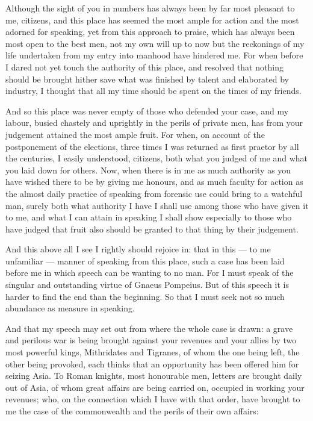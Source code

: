 %

 Although the sight of you in numbers has always been by far most pleasant to me, citizens, and this place has seemed the most ample for action and the most adorned for speaking, yet from this approach to praise, which has always been most open to the best men, not my own will up to now but the reckonings of my life undertaken from my entry into manhood have hindered me. For when before I dared not yet touch the authority of this place, and resolved that nothing should be brought hither save what was finished by talent and elaborated by industry, I thought that all my time should be spent on the times of my friends.

 And so this place was never empty of those who defended your case, and my labour, busied chastely and uprightly in the perils of private men, has from your judgement attained the most ample fruit. For when, on account of the postponement of the elections, three times I was returned as first praetor by all the centuries, I easily understood, citizens, both what you judged of me and what you laid down for others. Now, when there is in me as much authority as you have wished there to be by giving me honours, and as much faculty for action as the almost daily practice of speaking from forensic use could bring to a watchful man, surely both what authority I have I shall use among those who have given it to me, and what I can attain in speaking I shall show especially to those who have judged that fruit also should be granted to that thing by their judgement.

 And this above all I see I rightly should rejoice in: that in this --- to me unfamiliar --- manner of speaking from this place, such a case has been laid before me in which speech can be wanting to no man. For I must speak of the singular and outstanding virtue of Gnaeus Pompeius. But of this speech it is harder to find the end than the beginning. So that I must seek not so much abundance as measure in speaking.

 And that my speech may set out from where the whole case is drawn: a grave and perilous war is being brought against your revenues and your allies by two most powerful kings, Mithridates and Tigranes, of whom the one being left, the other being provoked, each thinks that an opportunity has been offered him for seizing Asia. To Roman knights, most honourable men, letters are brought daily out of Asia, of whom great affairs are being carried on, occupied in working your revenues; who, on the connection which I have with that order, have brought to me the case of the commonwealth and the perils of their own affairs:

